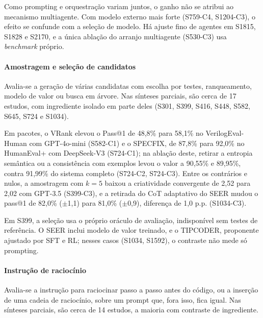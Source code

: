 Como prompting e orquestração variam juntos, o ganho não se atribui ao mecanismo multiagente. Com modelo externo mais forte (S759-C4, S1204-C3), o efeito se confunde com a seleção de modelo. Há ajuste fino de agentes em S1815, S1828 e S2170, e a única ablação do arranjo multiagente (S530-C3) usa \textit{benchmark} próprio.

\paragraph{Amostragem e seleção de candidatos}
Avalia-se a geração de várias candidatas com escolha por testes, ranqueamento, modelo de valor ou busca em árvore. Nas sínteses parciais, são cerca de 17 estudos, com ingrediente isolado em parte deles (S301, S399, S416, S448, S582, S645, S724 e S1034).

Em pacotes, o VRank elevou o Pass@1 de 48,8\% para 58,1\% no VerilogEval-Human com GPT-4o-mini (S582-C1) e o SPECFIX, de 87,8\% para 92,0\% no HumanEval+ com DeepSeek-V3 (S724-C1); na ablação deste, retirar a entropia semântica ou a consistência com exemplos levou o valor a 90,55\% e 89,95\%, contra 91,99\% do sistema completo (S724-C2, S724-C3).
Entre os contrários e nulos, a amostragem com $k = 5$ baixou a criatividade convergente de 2,52 para 2,02 com GPT-3.5 (S399-C3), e a retirada do CoT adaptativo do SEER mudou o pass@1 de 82,0\% ($\pm$1,1) para 81,0\% ($\pm$0,9), diferença de 1,0 p.p. (S1034-C3).

Em S399, a seleção usa o próprio oráculo de avaliação, indisponível sem testes de referência. O SEER inclui modelo de valor treinado, e o TIPCODER, proponente ajustado por SFT e RL; nesses casos (S1034, S1592), o contraste não mede só prompting.

\paragraph{Instrução de raciocínio}
Avalia-se a instrução para raciocinar passo a passo antes do código, ou a inserção de uma cadeia de raciocínio, sobre um prompt que, fora isso, fica igual. Nas sínteses parciais, são cerca de 14 estudos, a maioria com contraste de ingrediente.

